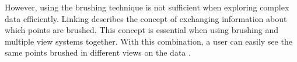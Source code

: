 However, using the brushing technique is not sufficient when exploring complex data efficiently. Linking describes the concept of exchanging information about which points are brushed. This concept is essential when using brushing and multiple view systems together. With this combination, a user can easily see the same points brushed in different views on the data .

